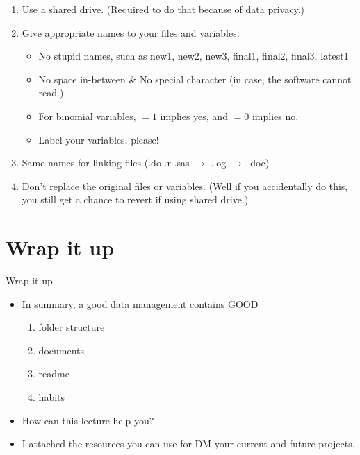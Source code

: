 \begin{frame}{\secname}

\begin{enumerate}[<+->]
	\item<1|handout:1->  Use a shared drive. (Required to do that because of data privacy.)
	\item<2|handout:2->  Give appropriate names to your files and variables.
		\begin{itemize}[<+->]
			\item<3|handout:3->  No stupid names, such as new1, new2, new3, final1, final2, final3, latest1
			\item<4|handout:4->  No space in-between \& No special character (in case, the software cannot read.)
			\item<5|handout:5->  For binomial variables, $=1$ implies yes, and $=0$ implies no.
			\item<6|handout:6->  Label your variables, please!
		\end{itemize}
	\item<7|handout:7->  Same names for linking files (.do .r .sas $\rightarrow$ .log $\rightarrow$ .doc)
	\item<8|handout:8>  Don't replace the original files or variables. (Well if you accidentally do this, you still get a chance to revert if using shared drive.)
\end{enumerate}
	
\end{frame}


\section{Wrap it up}
\begin{frame}{Wrap it up}
\begin{itemize}
\item<1|handout:1->  In summary, a good data management contains GOOD
\begin{enumerate}
	\item folder structure
	\item documents
	\item readme
	\item habits
\end{enumerate}

\item<2|handout:2>  How can this lecture help you? \\
\item<2|handout:2>  I attached the resources you can use for DM your current and future projects.
\end{itemize}
\end{frame}

